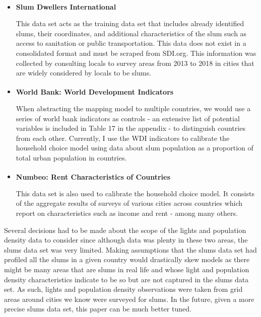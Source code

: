 \begin{itemize}
    \item \textbf{Slum Dwellers International}\textsuperscript{\cite{slumdata}}
    
    This data set acts as the training data set that includes already identified slums, their coordinates, and additional characteristics of the slum such as access to sanitation or public transportation. This data does not exist in a consolidated format and must be scraped from SDI.org. This information was collected by consulting locals to survey areas from 2013 to 2018 in cities that are widely considered by locals to be slums.

    \item \textbf{World Bank: World Development Indicators}\textsuperscript{\cite{wdislums}}

    When abstracting the mapping model to multiple countries, we would use a series of world bank indicators as controls - an extensive list of potential variables is included in Table 17 in the appendix - to distinguish countries from each other. Currently, I use the WDI indicators to calibrate the household choice model using data about slum population as a proportion of total urban population in countries.

    \item \textbf{Numbeo: Rent Characteristics of Countries}\textsuperscript{\cite{Numbeo}}

    This data set is also used to calibrate the household choice model. It consists of the aggregate results of surveys of various cities across countries which report on characteristics such as income and rent - among many others.
    
\end{itemize}

 Several decisions had to be made about the scope of the lights and population density data to consider since although data was plenty in these two areas, the slums data set was very limited. Making assumptions that the slums data set had profiled all the slums in a given country would drastically skew models as there might be many areas that are slums in real life and whose light and population density characteristics indicate to be so but are not captured in the slums data set. As such, lights and population density observations were taken from grid areas around cities we know were surveyed for slums. In the future, given a more precise slums data set, this paper can be much better tuned. 

